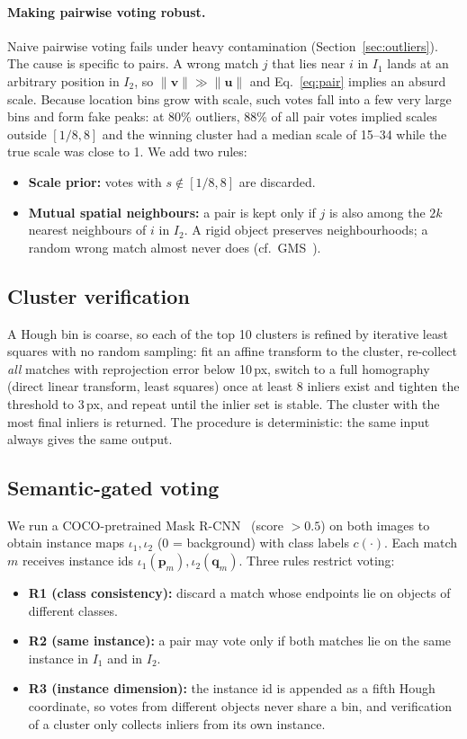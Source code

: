 \documentclass{article}
\begin{document}
\paragraph{Making pairwise voting robust.} Naive pairwise voting fails under
heavy contamination (Section~\ref{sec:outliers}). The cause is specific to
pairs. A wrong match $j$ that lies near $i$ in $I_1$ lands at an arbitrary
position in $I_2$, so $\lVert\mathbf{v}\rVert \gg \lVert\mathbf{u}\rVert$ and
Eq.~\eqref{eq:pair} implies an absurd scale. Because location bins grow with
scale, such votes fall into a few very large bins and form fake peaks: at
80\% outliers, 88\% of all pair votes implied scales outside $[1/8, 8]$ and
the winning cluster had a median scale of 15--34 while the true scale was
close to 1. We add two rules:
\begin{itemize}
  \item \textbf{Scale prior:} votes with $s \notin [1/8, 8]$ are discarded.
  \item \textbf{Mutual spatial neighbours:} a pair is kept only if $j$ is also
  among the $2k$ nearest neighbours of $i$ in $I_2$. A rigid object preserves
  neighbourhoods; a random wrong match almost never does (cf.\ GMS~\cite{bian2017gms}).
\end{itemize}

\subsection{Cluster verification}
A Hough bin is coarse, so each of the top 10 clusters is refined by iterative
least squares with no random sampling: fit an affine transform to the
cluster, re-collect \emph{all} matches with reprojection error below 10\,px,
switch to a full homography (direct linear transform, least squares) once at
least 8 inliers exist and tighten the threshold to 3\,px, and repeat until the
inlier set is stable. The cluster with the most final inliers is returned. The
procedure is deterministic: the same input always gives the same output.

\subsection{Semantic-gated voting}
We run a COCO-pretrained Mask R-CNN~\cite{he2017maskrcnn} (score $>0.5$) on
both images to obtain instance maps $\iota_1, \iota_2$ (0 = background) with
class labels $c(\cdot)$. Each match $m$ receives instance ids
$\iota_1(\mathbf{p}_m), \iota_2(\mathbf{q}_m)$. Three rules restrict voting:
\begin{itemize}
  \item \textbf{R1 (class consistency):} discard a match whose endpoints lie on
  objects of different classes.
  \item \textbf{R2 (same instance):} a pair may vote only if both matches lie on
  the same instance in $I_1$ and in $I_2$.
  \item \textbf{R3 (instance dimension):} the instance id is appended as a fifth
  Hough coordinate, so votes from different objects never share a bin, and
  verification of a cluster only collects inliers from its own instance.
\end{itemize}
\end{document}
